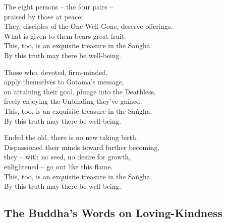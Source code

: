 The eight persons -- the four pairs --\\
praised by those at peace:\\
They, disciples of the One Well-Gone, deserve offerings.\\
What is given to them bears great fruit.\\
This, too, is an exquisite treasure in the Saṅgha.\\
By this truth may there be well-being.

Those who, devoted, firm-minded,\\
apply themselves to Gotama's message,\\
on attaining their goal, plunge into the Deathless,\\
freely enjoying the Unbinding they've gained.\\
This, too, is an exquisite treasure in the Saṅgha.\\
By this truth may there be well-being.

Ended the old, there is no new taking birth.\\
Dispassioned their minds toward further becoming,\\
they -- with no seed, no desire for growth,\\
enlightened -- go out like this flame.\\
This, too, is an exquisite treasure in the Saṅgha.\\
By this truth may there be well-being.

\subsection{The Buddha's Words on Loving-Kindness}
\label{karaniyam-attha}



